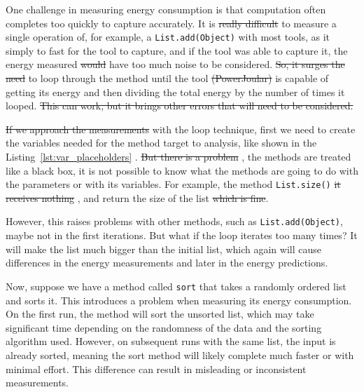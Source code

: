 One challenge in measuring energy consumption is that computation often completes too quickly to capture accurately. It is \st{really difficult}  to measure a single operation of, for example, a \texttt{List.add(Object)} with most tools, as it simply to fast for the tool to capture, and if the tool was able to capture it, the energy measured \st{would}  have too much noise to be considered. \st{So, it surges the need}  to loop through the method until the tool \st{(PowerJoular)} is capable of getting its energy and then dividing the total energy by the number of times it looped. \st{This can work, but it brings other errors that will need to be considered.}

\st{If we approach the measurements}  with the loop technique, first we need to create the variables needed for the method target to analysis, like shown in the Listing~\ref{lst:var_placeholders} . \st{But there is a problem} , the methods are treated like a black box, it is not possible to know what the methods are going to do with the parameters or with its variables. For example, the method \texttt{List.size()} \st{it receives nothing} , and return the size of the list \st{which is fine}. 

However, this raises problems with other methods, such as \texttt{List.add(Object)}, maybe not in the first iterations. But what if the loop iterates too many times? It will make the list much bigger than the initial list, which again will cause differences in the energy measurements and later in the energy predictions. 

Now, suppose we have a method called \texttt{sort} that takes a randomly ordered list and sorts it. This introduces a problem when measuring its energy consumption. On the first run, the method will sort the unsorted list, which may take significant time depending on the randomness of the data and the sorting algorithm used. However, on subsequent runs with the same list, the input is already sorted, meaning the sort method will likely complete much faster or with minimal effort. This difference can result in misleading or inconsistent measurements.

